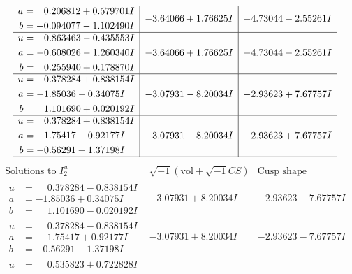 \documentclass[1p]{elsarticle_modified}
\theoremstyle{definition}
\newcommand{\I}{\sqrt{-1}}
\begin{document}
$$\begin{array}{c|c|c}
\begin{aligned}
a &= \phantom{-}0.206812 + 0.579701 I \\
b &= -0.094077 - 1.102490 I\end{aligned}
 & -3.64066 + 1.76625 I & -4.73044 - 2.55261 I \\ \hline\begin{aligned}
u &= \phantom{-}0.863463 - 0.435553 I \\
a &= -0.608026 - 1.260340 I \\
b &= \phantom{-}0.255940 + 0.178870 I\end{aligned}
 & -3.64066 + 1.76625 I & -4.73044 - 2.55261 I \\ \hline\begin{aligned}
u &= \phantom{-}0.378284 + 0.838154 I \\
a &= -1.85036 - 0.34075 I \\
b &= \phantom{-}1.101690 + 0.020192 I\end{aligned}
 & -3.07931 - 8.20034 I & -2.93623 + 7.67757 I \\ \hline\begin{aligned}
u &= \phantom{-}0.378284 + 0.838154 I \\
a &= \phantom{-}1.75417 - 0.92177 I \\
b &= -0.56291 + 1.37198 I\end{aligned}
 & -3.07931 - 8.20034 I & -2.93623 + 7.67757 I\\
 \hline 
 \end{array}$$\newpage$$\begin{array}{c|c|c}  
\text{Solutions to }I^u_{2}& \I (\text{vol} + \sqrt{-1}CS) & \text{Cusp shape}\\
 \hline 
\begin{aligned}
u &= \phantom{-}0.378284 - 0.838154 I \\
a &= -1.85036 + 0.34075 I \\
b &= \phantom{-}1.101690 - 0.020192 I\end{aligned}
 & -3.07931 + 8.20034 I & -2.93623 - 7.67757 I \\ \hline\begin{aligned}
u &= \phantom{-}0.378284 - 0.838154 I \\
a &= \phantom{-}1.75417 + 0.92177 I \\
b &= -0.56291 - 1.37198 I\end{aligned}
 & -3.07931 + 8.20034 I & -2.93623 - 7.67757 I \\ \hline\begin{aligned}
u &= \phantom{-}0.535823 + 0.722828 I \\

\end{aligned}
\end{array}$$
\end{document}
